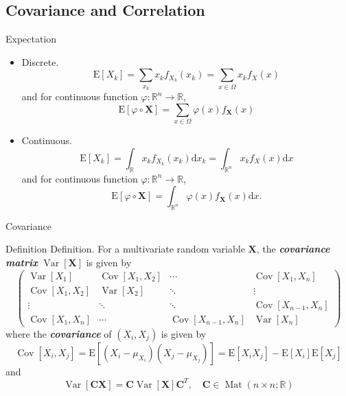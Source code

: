 \documentclass{beamer}
\newcommand{\bb}[1]{\textcolor{antiquefuchsia}{\textbf{\textit{#1}}}}
\begin{document}
\subsection{Covariance and Correlation}
\begin{frame}{Expectation}
\begin{itemize}
\item Discrete.
$$
\mathrm{E}\left[X_{k}\right]=\sum_{x_{k}} x_{k} f_{X_{k}}\left(x_{k}\right)=\sum_{x \in \Omega} x_{k} f_{X}(x)
$$
and for continuous function $\varphi: \mathbb{R}^{n} \rightarrow \mathbb{R}$,
$$
\mathrm{E}[\varphi \circ \mathbf{X}]=\sum_{x \in \Omega} \varphi(x) f_{\mathbf{X}}(x)
$$
\item Continuous.
$$
\mathrm{E}\left[X_{k}\right]=\int_{\mathbb{R}} x_{k} f_{X_{k}}\left(x_{k}\right) \mathrm{d} x_{k}=\int_{\mathbb{R}^{n}} x_{k} f_{X}(x) \mathrm{d} x
$$
and for continuous function $\varphi: \mathbb{R}^{n} \rightarrow \mathbb{R}$,
$$
\mathrm{E}[\varphi \circ \mathbf{X}]=\int_{\mathbb{R}^{n}} \varphi(x) f_{\mathbf{X}}(x) \mathrm{d} x .
$$
\end{itemize}
\end{frame}


\begin{frame}{Covariance}
\begin{block}{Definition}
Definition. For a multivariate random variable $\mathbf{X}$, the \bb{covariance matrix} $\operatorname{Var}[\mathbf{X}]$ is given by
$$
\left(\begin{array}{cccc}
\operatorname{Var}\left[X_{1}\right] & \operatorname{Cov}\left[X_{1}, X_{2}\right] & \cdots & \operatorname{Cov}\left[X_{1}, X_{n}\right] \\
\operatorname{Cov}\left[X_{1}, X_{2}\right] & \operatorname{Var}\left[X_{2}\right] & \ddots & \vdots \\
\vdots & \ddots & \ddots & \operatorname{Cov}\left[X_{n-1}, X_{n}\right] \\
\operatorname{Cov}\left[X_{1}, X_{n}\right] & \cdots & \operatorname{Cov}\left[X_{n-1}, X_{n}\right] & \operatorname{Var}\left[X_{n}\right]
\end{array}\right)
$$
where the \bb{covariance} of $\left(X_{i}, X_{j}\right)$ is given by
$$
\operatorname{Cov}\left[X_{i}, X_{j}\right]=\mathrm{E}\left[\left(X_{i}-\mu_{X_{i}}\right)\left(X_{j}-\mu_{X_{j}}\right)\right]=\mathrm{E}\left[X_{i} X_{j}\right]-\mathrm{E}\left[X_{i}\right] \mathrm{E}\left[X_{j}\right]
$$
and
$$
\operatorname{Var}[\mathbf{C X}]=\mathbf{C} \operatorname{Var}[\mathbf{X}] \mathbf{C}^{T}, \quad \mathbf{C} \in \operatorname{Mat}(n \times n ; \mathbb{R})
$$
\end{block}
\end{frame}
\end{document}

